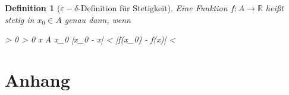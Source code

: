 \documentclass{article}
\newtheorem{defn}{Definition}[section]
\newenvironment{aleq*}{\begin{equation*}\begin{aligned}}{\end{aligned}\end{equation*}}
\begin{document}
	\begin{defn}[\(\varepsilon-\delta\)-Definition für Stetigkeit]
		Eine Funktion \(f \colon A \to \mathbb{R}\) heißt stetig in \(x_0 \in A\) genau dann, wenn
		\begin{aleq*}
			\forall \varepsilon > 0 \colon \exists \delta > 0 \colon \forall x \in A \setminus \left\lbrace x_0 \right\rbrace \colon |x_0 - x| < \delta \implies |f(x_0) - f(x)| < \varepsilon {}
		\end{aleq*}
	\end{defn}
	
	
	\newpage
	
	\part{Anhang}
	
\end{document}
